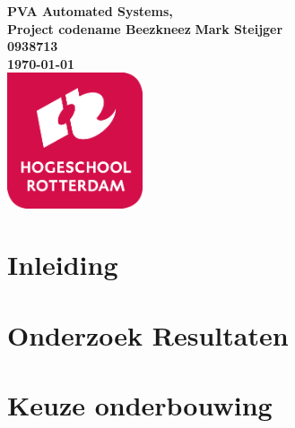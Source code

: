 \documentclass{article}
\begin{document}
\sffamily
\begin{titlepage}
  \centering
    \vfill
    {\bfseries\Huge
      PVA Automated Systems, \\
      Project codename Beezkneez
        \vskip2cm
      }
      {\bfseries\Large
        Mark Steijger\\
      }
      {
        \bfseries\normalsize
        0938713\\
        \vskip1cm
        \today\\
    }
    \vfill
    \includegraphics[width=4cm]{logohr.png} %
    \vfill
    \vfill
\end{titlepage}
\newpage
\tableofcontents

\newpage
\section{Inleiding}


\newpage
\section{Onderzoek Resultaten}




\newpage
\section{Keuze onderbouwing}





\newpage


\end{document}
